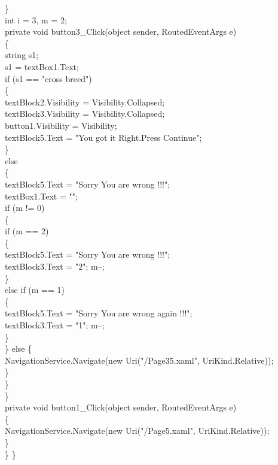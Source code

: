 {{        \}\\
        int i = 3, m = 2;\\
        private void button3_Click(object sender, RoutedEventArgs e)\\
        \{\\
            string s1;\\
            s1 = textBox1.Text;\\
            if (s1 == "cross breed")\\
            \{\\
                textBlock2.Visibility = Visibility.Collapsed;\\
                textBlock3.Visibility = Visibility.Collapsed;\\
                button1.Visibility = Visibility;\\
                textBlock5.Text = "You got it Right.Press Continue";\\
                
           \}\\
            else\\
            \{\\
                textBlock5.Text = "Sorry You are wrong !!!";\\
                textBox1.Text = "";\\
                if (m != 0)\\
                \{\\

                    if (m == 2)\\
                    \{\\
                        
                        textBlock5.Text = "Sorry You are wrong !!!";\\
                        textBlock3.Text = "2"; m--;\\
                    \}\\
                    else if (m == 1)\\
                    \{\\
                        textBlock5.Text = "Sorry You are wrong again !!!";\\
                        textBlock3.Text = "1"; m--;\\
                    \}\\
                \}
                else
                \{\\
                    NavigationService.Navigate(new Uri("/Page35.xaml", UriKind.Relative));\\
                \}\\
            \}\\
        \}\\
        private void button1_Click(object sender, RoutedEventArgs e)\\
        \{\\
            NavigationService.Navigate(new Uri("/Page5.xaml", UriKind.Relative));\\
        \}\\
    \}
\}




}}
